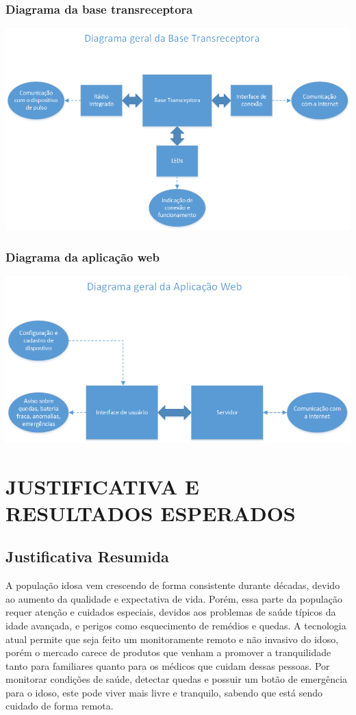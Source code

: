\documentclass[a4paper]{article}
\begin{document}
\subsubsection{Diagrama da base transreceptora}
\begin{center}
\includegraphics[scale=0.75]{figuras/diagrama_base}
\end{center}

\subsubsection{Diagrama da aplicação web}
\begin{center}
\includegraphics[scale=0.75]{figuras/diagrama_web}
\end{center}

\section{JUSTIFICATIVA E RESULTADOS ESPERADOS}

\subsection{Justificativa Resumida}
A população idosa vem crescendo de forma consistente durante décadas, devido ao aumento da qualidade e expectativa de vida. Porém, essa parte da população requer atenção e cuidados especiais, devidos aos problemas de saúde típicos da idade avançada, e perigos como esquecimento de remédios e quedas. A tecnologia atual permite que seja feito um monitoramente remoto e não invasivo do idoso, porém o mercado carece de produtos que venham a promover a tranquilidade tanto para familiares quanto para os médicos que cuidam dessas pessoas. Por monitorar condições de saúde, detectar quedas e possuir um botão de emergência para o idoso, este pode viver mais livre e tranquilo, sabendo que está sendo cuidado de forma remota.
\end{document}
